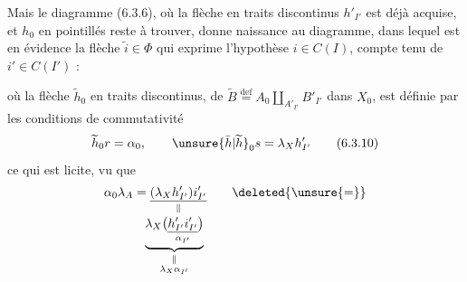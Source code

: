Mais le diagramme (6.3.6), où la flèche
en traits discontinus $h'_{I'}$ est déjà acquise,
et $h_0$ en pointillés reste à trouver, donne
naissance au diagramme, dans lequel
est  en évidence la flèche \uline{$\widetilde i\in\Phi$}
qui exprime l'hypothèse $i\in C(I)$,
compte tenu de $i'\in C(I')$ :


où la flèche $\widetilde h_0$ en traits discontinus,
de $\widetilde B\overset{\mathrm{def}}{=}A_0\amalg_{A'_{I'}}B'_{I'}$ dans $X_0$, est définie
par les conditions de commutativité
\[
 \widetilde h_0r=\alpha_0,\qquad \unsure{\bar h|\widetilde h}_0s=\lambda_X h'_{I'}\tag*{(6.3.10)}
\]
ce qui est licite, vu que
\[
 \begin{aligned}
 \alpha_0\lambda_A &=
 \underset{\Vert}{\underline{(\lambda_X h'_{I'})i'_{I'}}}\qquad\deleted{\unsure{=}}\\[-2pt]
 &\phantom{=}\underbrace{\lambda_X\bigl(\underset{\alpha_{I'}}{\underline{h'_{I'}i'_{I'}}}\bigr)}_{\substack{\Vert\\\lambda_X\alpha_{I'}}}
 \end{aligned}
\]

